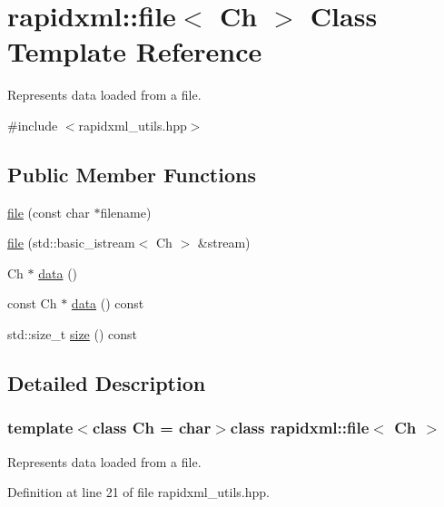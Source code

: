 \hypertarget{classrapidxml_1_1file}{\section{rapidxml\-:\-:file$<$ Ch $>$ Class Template Reference}
\label{classrapidxml_1_1file}
}


Represents data loaded from a file.  




{\ttfamily \#include $<$rapidxml\-\_\-utils.\-hpp$>$}

\subsection*{Public Member Functions}
\begin{DoxyCompactItemize}
\item 
\hyperlink{classrapidxml_1_1file_ae881a3cab1fe7152d45c92a8d7606cb3}{file} (const char $\ast$filename)
\item 
\hyperlink{classrapidxml_1_1file_a90707ccd991cc392dcf4bef37eed9d1f}{file} (std\-::basic\-\_\-istream$<$ Ch $>$ \&stream)
\item 
Ch $\ast$ \hyperlink{classrapidxml_1_1file_af1c71d65862c7af14e4708e32a80c1de}{data} ()
\item 
const Ch $\ast$ \hyperlink{classrapidxml_1_1file_aceb8f5ebd577c946a74b1ea3e2e0c576}{data} () const 
\item 
std\-::size\-\_\-t \hyperlink{classrapidxml_1_1file_a20191d167c6e00a88a44ca9a3a54e1c5}{size} () const 
\end{DoxyCompactItemize}


\subsection{Detailed Description}
\subsubsection*{template$<$class Ch = char$>$class rapidxml\-::file$<$ Ch $>$}

Represents data loaded from a file. 

Definition at line 21 of file rapidxml\-\_\-utils.\-hpp.



